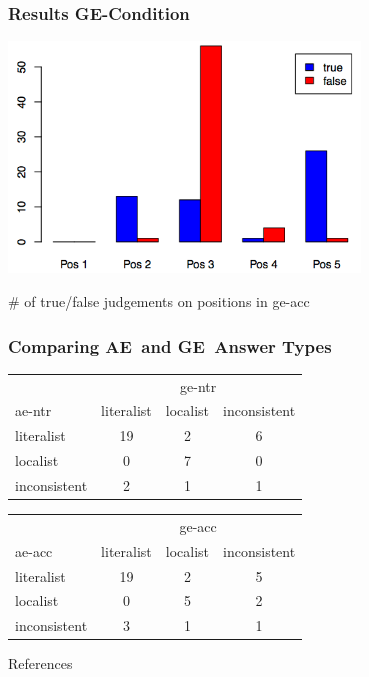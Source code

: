 \documentclass[fleqn,10pt,serif,xcolor=dvipsnames]{beamer}
\renewcommand{\AE}{AE}
\newcommand{\GE}{GE}
\begin{document}
\begin{frame}
  \frametitle{Results \GE-Condition}
  \begin{center}
    \includegraphics[width=0.7\textwidth]{../../pictures/ge-acc.png}

    \vspace{0.2cm}
    \# of true/false judgements on positions in ge-acc
  \end{center}
\end{frame}


\begin{frame}
  \frametitle{Comparing \AE\ and \GE\ Answer Types}

  \begin{center}
    \begin{tabular}{lccc}
      & \multicolumn{3}{c}{ge-ntr} \\ \cmidrule(r){2-4}
      ae-ntr & literalist & localist & inconsistent \\ \midrule
      literalist   & 19 & 2 & 6\\
      localist     &  0 & 7 & 0 \\
      inconsistent &  2 & 1 & 1\\
    \end{tabular}
  \end{center}

  \medskip

  \begin{center}
    \begin{tabular}{lccc}
      & \multicolumn{3}{c}{ge-acc} \\ \cmidrule(r){2-4}
      ae-acc & literalist & localist & inconsistent \\ \midrule
      literalist   & 19 & 2 & 5\\
      localist     &  0 & 5 & 2 \\
      inconsistent &  3 & 1 & 1\\
    \end{tabular}
  \end{center}


\end{frame}




\begin{frame}
  \begin{block}{References}
    \printbibliography[heading=subbibliography]
  \end{block}
\end{frame}
\end{document}
